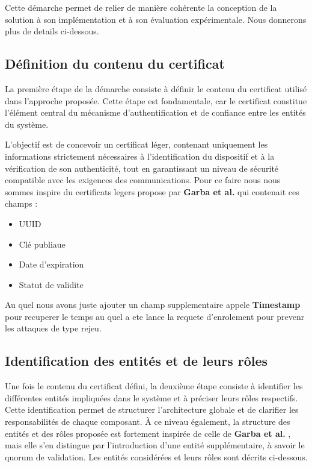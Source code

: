\documentclass[12pt]{report}
\begin{document}
\begin{itemize}
\begin{itemize}
Cette démarche permet de relier de manière cohérente la conception de la solution à son implémentation et à son évaluation expérimentale. Nous donnerons plus de details ci-dessous. 

\subsection{Définition du contenu du certificat}

La première étape de la démarche consiste à définir le contenu du certificat utilisé dans l’approche proposée. Cette étape est fondamentale, car le certificat constitue l’élément central du mécanisme d’authentification et de confiance entre les entités du système.

L’objectif est de concevoir un certificat léger, contenant uniquement les informations strictement nécessaires à l’identification du dispositif et à la vérification de son authenticité, tout en garantissant un niveau de sécurité compatible avec les exigences des communications. Pour ce faire nous nous sommes inspire du certificats legers propose par \textbf{Garba et al.}\cite{garba2023lightcert4iots} qui contenait ces champs : 
\begin{itemize}
    \item UUID
    \item Clé publiaue 
    \item Date d'expiration
    \item Statut de validite
\end{itemize}
Au quel nous avons juste ajouter un champ supplementaire appele \textbf{Timestamp} pour recuperer le temps au quel a ete lance la requete d'enrolement pour prevenr les attaques de type rejeu.

\subsection{Identification des entités et de leurs rôles}

Une fois le contenu du certificat défini, la deuxième étape consiste à identifier les différentes entités impliquées dans le système et à préciser leurs rôles respectifs. Cette identification permet de structurer l’architecture globale et de clarifier les responsabilités de chaque composant. À ce niveau également, la structure des entités et des rôles proposée est fortement inspirée de celle de \textbf{Garba et al.} \cite{garba2023lightcert4iots}, mais elle s’en distingue par l’introduction d’une entité supplémentaire, à savoir le quorum de validation. Les entités considérées et leurs rôles sont décrits ci-dessous.


\end{itemize}
\end{itemize}
\end{document}

